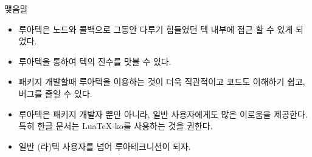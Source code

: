\documentclass[t,10pt]{beamer}
\begin{document}
\begin{frame}{맺음말}
  \begin{itemize}
  \item 루아텍은 노드와 콜백으로 그동안 다루기 힘들었던 텍 내부에 접근 할 수
    있게 되었다.
  \item 루아텍을 통하여 텍의 진수를 맛볼  수 있다.
  \item 패키지 개발할때 루아텍을 이용하는 것이 더욱 직관적이고 코드도 이해하기
    쉽고, 버그를 줄일 수 있다.
  \item 루아텍은 패키지 개발자 뿐만 아니라, 일반 사용자에게도 많은 이로움을
    제공한다. 특히 한글 문서는 Lua\TeX-ko를 사용하는 것을 권한다.
  \item 일반 (라)텍 사용자를 넘어 루아테크니션이 되자.
  \end{itemize}
\end{frame}
\end{document}
